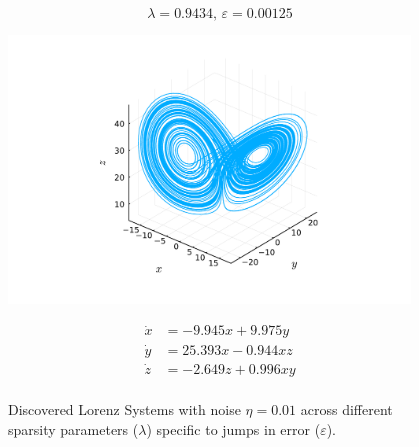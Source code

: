 \documentclass[10pt]{paper}
\begin{document}
\begin{figure}[ptb]
	\caption{Discovered Lorenz Systems with noise $\eta = 0.01$ across different sparsity parameters ($\lambda$) specific to jumps in error ($\varepsilon$).}
	\label{fig:lambda_variation}
	\centering 

	\begin{minipage}{0.47\textwidth}
		\[ \lambda = 0.9434, \, \varepsilon = 0.00125 \] 
		\begin{center}
			\includegraphics[width=0.95\textwidth, trim={4.3cm, 1.6cm, 4.3cm, 2.5cm}, clip]{lorenz_lambda_1.pdf}
		\end{center}
		\[ \begin{aligned}
			\dot x &= -9.945x + 9.975y \\
			\dot y &= 25.393x -0.944xz\\ 
			\dot z &= -2.649z + 0.996xy \\ 
		\end{aligned} \]

		\vspace{1em}


\end{minipage}
\end{figure}
\end{document}
